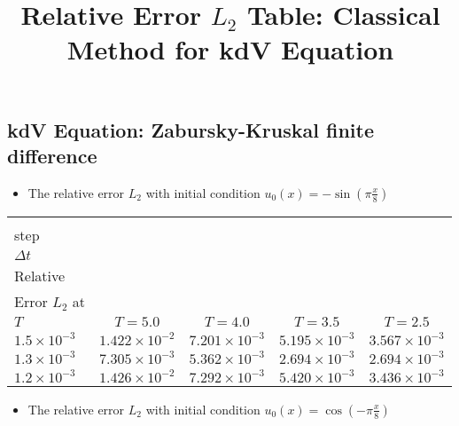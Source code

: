\documentclass[12pt]{article}
\begin{document}
\title{Relative Error $L_{2}$ Table: Classical Method for kdV Equation}
\author{}
\date{}

\maketitle



\subsection{kdV Equation: Zabursky-Kruskal finite difference}

\begin{itemize}
    \item The relative error $L_{2}$ with initial condition $u_{0}(x) = -\sin(\pi \frac{x}{8})$
\end{itemize}

\centering
\begin{tabular}{|l|c|c|c|c|   }\hline
\diagbox[width=9em]{Time\\step\\$\Delta t$}{\\Relative\\Error $L_{2}$ at\\$T$ }&
  $T=5.0$ & $T=4.0$ & $T=3.5$ & $T=2.5$ \\ \hline
 $1.5 \times 10^{-3}$ & $1.422 \times 10^{-2}$ & $7.201 \times 10^{-3}$ & $5.195 \times 10^{-3}$ & $3.567 \times 10^{-3}$ \\ \hline
 $1.3 \times 10^{-3} $ & $7.305 \times 10^{-3}$ & $5.362 \times 10^{-3}$ & $2.694 \times 10^{-3}$ & $2.694 \times 10^{-3}$ \\ \hline
 $1.2\times 10^{-3}$ & $1.426 \times 10^{-2}$ & $7.292 \times 10^{-3}$ & $5.420 \times 10^{-3}$ & $3.436 \times 10^{-3}$ \\ \hline
\end{tabular}



\begin{itemize}
    \item The relative error $L_{2}$ with initial condition $u_{0}(x) = \cos(-\pi \frac{x}{8})$
\end{itemize}
\end{document}
